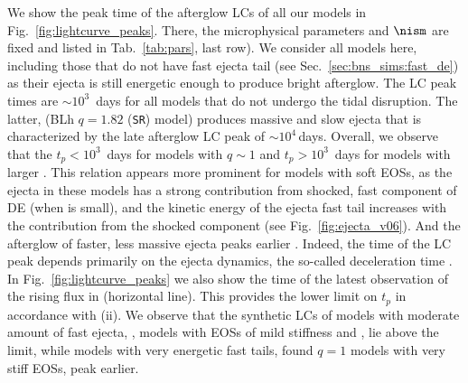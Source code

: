 We show the peak time of the afterglow \acp{LC} of all our models in 
Fig.~\ref{fig:lightcurve_peaks}. There, the microphysical parameters and $\nism$ are fixed 
and listed in Tab.~\ref{tab:pars}, last row). 
We consider all models here, including those that do not have fast ejecta tail 
(see Sec.~\ref{sec:bns_sims:fast_de}) as their ejecta is still energetic enough 
to produce bright afterglow. 
%
The \ac{LC} peak times are ${\sim}10^3$~days for all models that do not undergo the 
tidal disruption. The latter, (BLh $q=1.82$ (\texttt{SR}) model) produces massive and 
slow ejecta that is characterized by the late afterglow \ac{LC} peak 
of ${\sim}10^4\,$days.
%
Overall, we observe that the $t_{p}<10^3$~days for models with $q\sim1$ and 
$t_p>10^3$~days for models with larger \mr{}. This relation appears more prominent for 
models with soft \acp{EOS}, as the ejecta in these models has a strong contribution from 
shocked, fast component of \ac{DE} (when \mr{} is small), and the 
kinetic energy of the ejecta fast tail increases with the contribution from the 
shocked component (see Fig.~\ref{fig:ejecta_v06}). 
And the afterglow of faster, less massive ejecta peaks earlier 
\citep[\eg][]{Hotokezaka:2015eja}.
Indeed, the time of the \ac{LC} peak depends primarily on the ejecta 
dynamics, the so-called deceleration time \citep[\eg][]{Piran:2012wd}.
In Fig.~\ref{fig:lightcurve_peaks} we also show the time of the latest observation 
of the rising flux in \GRB{} (horizontal line). This provides the lower limit on $t_p$
in accordance with (ii).
%
We observe that the synthetic \acp{LC} of models with 
moderate amount of fast ejecta, \eg, models with 
\acp{EOS} of mild stiffness and \mr{}, lie above the limit, while models with very 
energetic fast tails, found $q=1$ models with very stiff \acp{EOS}, peak earlier. 

